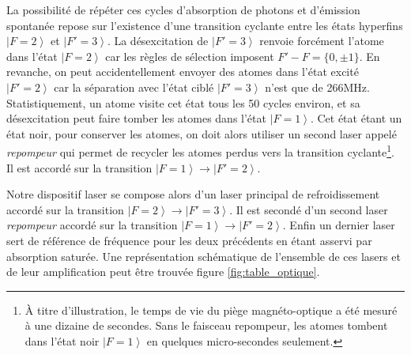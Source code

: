 La possibilité de répéter ces cycles d'absorption de photons et d'émission spontanée repose sur l'existence d'une transition cyclante entre les états hyperfins $\left| F=2 \right\rangle$ et $\left| F'=3 \right\rangle$. La désexcitation de $\left|F'=3\right\rangle$ renvoie forcément l'atome dans l'état $\left| F=2 \right\rangle$ car les règles de sélection imposent $F'-F= \lbrace 0, \pm 1 \rbrace$.
En revanche, on peut accidentellement envoyer des atomes dans l'état excité $\left| F'=2 \right\rangle$ car la séparation avec l'état ciblé $\left| F'=3 \right\rangle$ n'est que de 266MHz. Statistiquement, un atome visite cet état tous les 50 cycles environ, et sa désexcitation peut faire tomber les atomes dans l'état $\left|F=1\right\rangle$. Cet état étant un état noir, pour conserver les atomes, on doit alors utiliser un second laser appelé \emph{repompeur} qui permet de recycler les atomes perdus vers la transition cyclante\footnote{À titre d'illustration, le temps de vie du piège magnéto-optique a été mesuré à une dizaine de secondes. Sans le faisceau repompeur, les atomes tombent dans l'état noir $\left| F=1 \right\rangle$ en quelques micro-secondes seulement.}. Il est accordé sur la transition $\left| F=1 \right\rangle \rightarrow \left| F'=2 \right\rangle$.

Notre dispositif laser se compose alors d'un laser principal de refroidissement accordé sur la transition $\left| F=2 \right\rangle \rightarrow \left| F'=3 \right\rangle$. Il est secondé d'un second laser \emph{repompeur} accordé sur la transition $\left| F=1 \right\rangle \rightarrow \left| F'=2 \right\rangle$. Enfin un dernier laser sert de référence de fréquence pour les deux précédents en étant asservi par absorption saturée. Une représentation schématique de l'ensemble de ces lasers et de leur amplification peut être trouvée figure \ref{fig:table_optique}.

